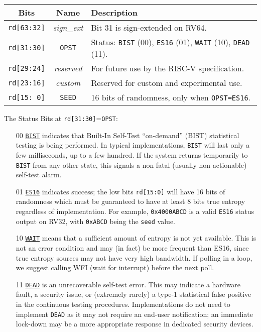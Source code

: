     \begin{center}
    \begin{tabular}{ccl}
    \toprule
    Bits    & Name  & Description \\
    \midrule
    \verb|rd[63:32]|    & {\it sign\_ext}
            & Bit 31 is sign-extended on RV64. \\
    \verb|rd[31:30]|    & \verb|OPST|
            & Status:   \verb|BIST| (00), \verb|ES16| (01),
                        \verb|WAIT| (10),   \verb|DEAD| (11). \\
    \verb|rd[29:24]|    & {\it reserved}
            & For future use by the RISC-V specification. \\
    \verb|rd[23:16]|    & {\it custom}
            & Reserved for custom and experimental use. \\
    \verb|rd[15: 0]|    & \verb|SEED|
            & 16 bits of randomness, only when \verb|OPST=ES16|.    \\
    \bottomrule
    \end{tabular}
    \end{center}

    The Status Bits at \verb|rd[31:30]|=\verb|OPST|:

\begin{itemize}
    \item[00]   \underline{\tt BIST}
    indicates that Built-In Self-Test ``on-demand'' (BIST) statistical
    testing is being performed. In typical implementations,
    \verb|BIST| will last only a few milliseconds, up to a few hundred.
 	If the system returns temporarily to \verb|BIST| from any other state,
	this signals a non-fatal (usually non-actionable) self-test alarm.

    \item[01]   \underline{\tt ES16}
    indicates success; the low bits \verb|rd[15:0]| will have 16 bits
    of randomness which must be guaranteed to have at least 8 bits true
    entropy regardless of implementation. For example, \verb|0x4000ABCD|
    is a valid \verb|ES16| status output on RV32, with \verb|0xABCD| being
    the \verb|seed| value.

    \item[10]   \underline{\tt WAIT}
    means that a sufficient amount of entropy is not yet available.
    This is not an error condition and may (in fact) be more frequent than
    ES16, since true entropy sources may not have very high bandwidth.
    If polling in a loop, we suggest calling WFI (wait for interrupt)
    before the next poll.

    \item[11]   \underline{\tt DEAD}
    is an unrecoverable self-test error. This may indicate a hardware
    fault, a security issue, or (extremely rarely) a type-1
    statistical false positive in the continuous testing procedures.
    Implementations do not need to implement \verb|DEAD| as it may not require
    an end-user notification; an immediate lock-down may be a more
    appropriate response in dedicated security devices.
\end{itemize}

